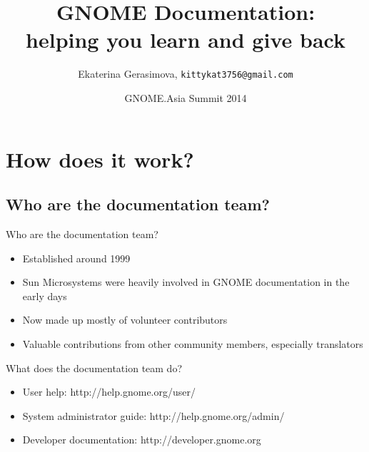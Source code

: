 \documentclass{beamer}
\title%
{GNOME Documentation:\\ helping you learn and give back}
\author
{Ekaterina Gerasimova, \texttt{kittykat3756@gmail.com}}
\date%
{GNOME.Asia Summit 2014}
\begin{document}
\begin{frame}
  \titlepage
\end{frame}

\section{How does it work?}

\subsection{Who are the documentation team?}

\begin{frame}{Who are the documentation team?}
  \begin{itemize}
  \item
    Established around 1999
  \item
    Sun Microsystems were heavily involved in GNOME documentation in the early days
  \item
    Now made up mostly of volunteer contributors
  \item
    Valuable contributions from other community members, especially translators
  \end{itemize}
\end{frame}

\begin{frame}{}
\end{frame}

\begin{frame}{}
\end{frame}

\begin{frame}{}
\end{frame}

\begin{frame}{What does the documentation team do?}
  \begin{itemize}
  \item
    User help: http://help.gnome.org/user/
  \item
    System administrator guide: http://help.gnome.org/admin/
  \item
    Developer documentation: http://developer.gnome.org
  \end{itemize}
\end{frame}
\end{document}
